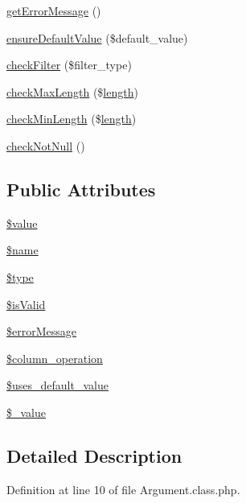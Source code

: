 \begin{DoxyCompactItemize}
\hyperlink{classArgument_a6e75159f2fad478ff488bf9cff5ba139}{get\+Error\+Message} ()
\item 
\hyperlink{classArgument_a4af92bc005f3d9328c63c0722fd3aef7}{ensure\+Default\+Value} (\$default\+\_\+value)
\item 
\hyperlink{classArgument_a4bdf58953a9b85a8999edabe5d341d43}{check\+Filter} (\$filter\+\_\+type)
\item 
\hyperlink{classArgument_acc5f170121988acf71c50e5941320112}{check\+Max\+Length} (\$\hyperlink{xpresseditor_8min_8js_a8251a40bc2803d85bf8a918f1f288cce}{length})
\item 
\hyperlink{classArgument_ac44c716b86dc42d5c0f0e4717a510c74}{check\+Min\+Length} (\$\hyperlink{xpresseditor_8min_8js_a8251a40bc2803d85bf8a918f1f288cce}{length})
\item 
\hyperlink{classArgument_a09edcec0bf4dbfeedec2f7652e44e57d}{check\+Not\+Null} ()
\end{DoxyCompactItemize}
\subsection*{Public Attributes}
\begin{DoxyCompactItemize}
\item 
\hyperlink{classArgument_a762eb8881d615f61189bba09b9bd7300}{\$value}
\item 
\hyperlink{classArgument_ab37a45cb92464255505b2f4f35909da6}{\$name}
\item 
\hyperlink{classArgument_a7a2272bc3d12787f80143fbea01698f4}{\$type}
\item 
\hyperlink{classArgument_af1a5d4055fd3e16bea7951843a3bdd92}{\$is\+Valid}
\item 
\hyperlink{classArgument_ad0af83b11507626a9c95fd188e60b592}{\$error\+Message}
\item 
\hyperlink{classArgument_a366cb3ac7d44ed1037c96ca2bfad6be4}{\$column\+\_\+operation}
\item 
\hyperlink{classArgument_a3f8f20477043da002ba9d48ede482baf}{\$uses\+\_\+default\+\_\+value}
\item 
\hyperlink{classArgument_aba96b050a81b62ccf10a78638d208353}{\$\+\_\+value}
\end{DoxyCompactItemize}


\subsection{Detailed Description}


Definition at line 10 of file Argument.\+class.\+php.



